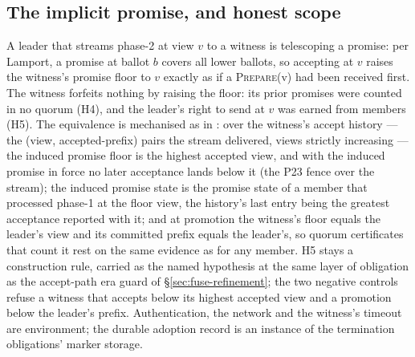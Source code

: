 \subsection{The implicit promise, and honest scope}
A leader that streams phase-2 at view $v$ to a witness is telescoping a
promise: per Lamport, a promise at ballot $b$ covers all lower ballots, so
accepting at $v$ raises the witness's promise floor to $v$ exactly as if a
\textsc{Prepare}(v) had been received first. The witness forfeits nothing
by raising the floor: its prior promises were counted in no quorum (H4),
and the leader's right to send at $v$ was earned from members (H5). The
equivalence is mechanised as  in
: over the witness's accept history --- the
(view, accepted-prefix) pairs the stream delivered, views strictly
increasing --- the induced promise floor is the highest accepted view, and
with the induced promise in force no later acceptance lands below it (the
P23 fence over the stream); the induced promise state is the promise state
of a member that processed phase-1 at the floor view, the history's last
entry being the greatest acceptance reported with it; and at promotion the
witness's floor equals the leader's view and its committed prefix equals
the leader's, so quorum certificates that count it rest on the same
evidence as for any member. H5 stays a construction rule, carried as the
named hypothesis  at the same layer of obligation as
the accept-path era guard of \S\ref{sec:fuse-refinement}; the two negative
controls refuse a witness that accepts below its highest accepted view and
a promotion below the leader's prefix. Authentication, the network and the
witness's timeout are environment; the durable adoption record is an
instance of the termination obligations' marker storage.
